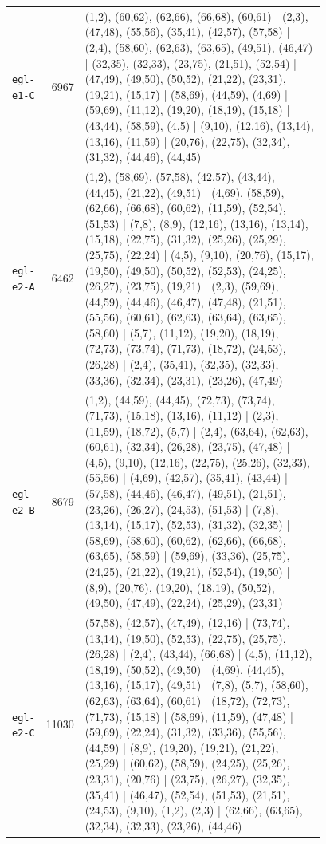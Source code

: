 \begin{landscape}
\begin{longtable}{lr>{\tiny\raggedright\arraybackslash}p{0.78\linewidth}}
\texttt{egl-e1-C} & 6967 & (1,2), (60,62), (62,66), (66,68), (60,61) | (2,3), (47,48), (55,56), (35,41), (42,57), (57,58) | (2,4), (58,60), (62,63), (63,65), (49,51), (46,47) | (32,35), (32,33), (23,75), (21,51), (52,54) | (47,49), (49,50), (50,52), (21,22), (23,31), (19,21), (15,17) | (58,69), (44,59), (4,69) | (59,69), (11,12), (19,20), (18,19), (15,18) | (43,44), (58,59), (4,5) | (9,10), (12,16), (13,14), (13,16), (11,59) | (20,76), (22,75), (32,34), (31,32), (44,46), (44,45) \\[2pt]
\texttt{egl-e2-A} & 6462 & (1,2), (58,69), (57,58), (42,57), (43,44), (44,45), (21,22), (49,51) | (4,69), (58,59), (62,66), (66,68), (60,62), (11,59), (52,54), (51,53) | (7,8), (8,9), (12,16), (13,16), (13,14), (15,18), (22,75), (31,32), (25,26), (25,29), (25,75), (22,24) | (4,5), (9,10), (20,76), (15,17), (19,50), (49,50), (50,52), (52,53), (24,25), (26,27), (23,75), (19,21) | (2,3), (59,69), (44,59), (44,46), (46,47), (47,48), (21,51), (55,56), (60,61), (62,63), (63,64), (63,65), (58,60) | (5,7), (11,12), (19,20), (18,19), (72,73), (73,74), (71,73), (18,72), (24,53), (26,28) | (2,4), (35,41), (32,35), (32,33), (33,36), (32,34), (23,31), (23,26), (47,49) \\[2pt]
\texttt{egl-e2-B} & 8679 & (1,2), (44,59), (44,45), (72,73), (73,74), (71,73), (15,18), (13,16), (11,12) | (2,3), (11,59), (18,72), (5,7) | (2,4), (63,64), (62,63), (60,61), (32,34), (26,28), (23,75), (47,48) | (4,5), (9,10), (12,16), (22,75), (25,26), (32,33), (55,56) | (4,69), (42,57), (35,41), (43,44) | (57,58), (44,46), (46,47), (49,51), (21,51), (23,26), (26,27), (24,53), (51,53) | (7,8), (13,14), (15,17), (52,53), (31,32), (32,35) | (58,69), (58,60), (60,62), (62,66), (66,68), (63,65), (58,59) | (59,69), (33,36), (25,75), (24,25), (21,22), (19,21), (52,54), (19,50) | (8,9), (20,76), (19,20), (18,19), (50,52), (49,50), (47,49), (22,24), (25,29), (23,31) \\[2pt]
\texttt{egl-e2-C} & 11030 & (57,58), (42,57), (47,49), (12,16) | (73,74), (13,14), (19,50), (52,53), (22,75), (25,75), (26,28) | (2,4), (43,44), (66,68) | (4,5), (11,12), (18,19), (50,52), (49,50) | (4,69), (44,45), (13,16), (15,17), (49,51) | (7,8), (5,7), (58,60), (62,63), (63,64), (60,61) | (18,72), (72,73), (71,73), (15,18) | (58,69), (11,59), (47,48) | (59,69), (22,24), (31,32), (33,36), (55,56), (44,59) | (8,9), (19,20), (19,21), (21,22), (25,29) | (60,62), (58,59), (24,25), (25,26), (23,31), (20,76) | (23,75), (26,27), (32,35), (35,41) | (46,47), (52,54), (51,53), (21,51), (24,53), (9,10), (1,2), (2,3) | (62,66), (63,65), (32,34), (32,33), (23,26), (44,46) \\[2pt]

\end{longtable}
\end{landscape}
